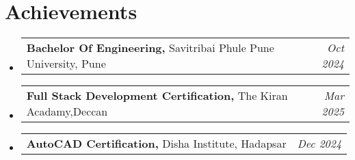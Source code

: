 \documentclass[a4paper,11pt]{article}
\makeatletter
\newcommand{\resumePOR}[3]{
\vspace{0.5mm}\item
    \begin{tabular*}{0.97\textwidth}[t]{l@{\extracolsep{\fill}}r}
        \textbf{#1}\hspace{0.3mm}#2 & \textit{\small{#3}} 
    \end{tabular*}
    \vspace{-2mm}
}
\newcommand{\resumeSubHeadingListStart}{\begin{itemize}[leftmargin=*,labelsep=0mm]}
\newcommand{\resumeSubHeadingListEnd}{\end{itemize}\vspace{2mm}}
\makeatother
\begin{document}
 \section{\textbf{Achievements}}
\vspace{-0.4mm}
 \resumeSubHeadingListStart
 \resumePOR{Bachelor Of Engineering,  } %
     {Savitribai Phule Pune University, Pune} %
     {Oct 2024} %
    
 \resumePOR{Full Stack Development Certification, } %
    {The Kiran Acadamy,Deccan} %
    {Mar 2025} %
 \resumePOR{AutoCAD  Certification, } %
    {Disha Institute, Hadapsar} %
    {Dec 2024} %
 \resumeSubHeadingListEnd


 \vspace{-5mm}



\end{document}
